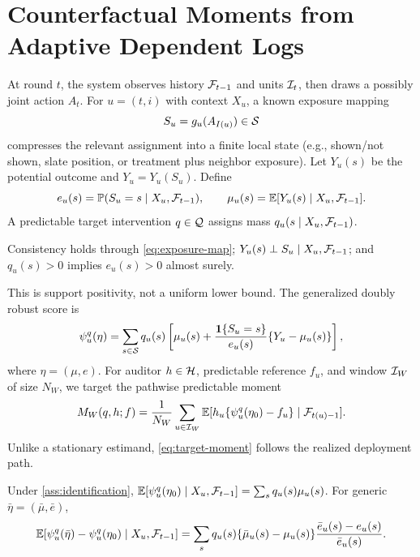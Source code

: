 \section{Counterfactual Moments from Adaptive Dependent Logs}
\label{sec:setup}

At round $t$, the system observes history $\mathcal{F}_{t-1}$ and units $\mathcal{I}_t$, then draws a possibly joint action $A_t$. For $u=(t,i)$ with context $X_u$, a known exposure mapping
\begin{equation}
S_u=g_u(A_{I(u)})\in\mathcal{S}
\label{eq:exposure-map}
\end{equation}
compresses the relevant assignment into a finite local state (e.g., shown/not shown, slate position, or treatment plus neighbor exposure). Let $Y_u(s)$ be the potential outcome and $Y_u=Y_u(S_u)$. Define
\begin{equation}
e_u(s)=\mathbb{P}(S_u=s\mid X_u,\mathcal{F}_{t-1}),\qquad
\mu_u(s)=\mathbb{E}[Y_u(s)\mid X_u,\mathcal{F}_{t-1}].
\label{eq:nuisance}
\end{equation}
A predictable target intervention $q\in\mathcal{Q}$ assigns mass $q_u(s\mid X_u,\mathcal{F}_{t-1})$.

\begin{assumption}
\label{ass:identification}
Consistency holds through \cref{eq:exposure-map}; $Y_u(s)\perp S_u\mid X_u,\mathcal{F}_{t-1}$; and $q_u(s)>0$ implies $e_u(s)>0$ almost surely.
\end{assumption}
This is support positivity, not a uniform lower bound. The generalized doubly robust score is
\begin{equation}
\psi_u^q(\eta)=\sum_{s\in\mathcal{S}}q_u(s)
\left[\mu_u(s)+\frac{\mathbf{1}\{S_u=s\}}{e_u(s)}\{Y_u-\mu_u(s)\}\right],
\label{eq:orthogonal-score}
\end{equation}
where $\eta=(\mu,e)$. For auditor $h\in\mathcal{H}$, predictable reference $f_u$, and window $\mathcal{I}_W$ of size $N_W$, we target the pathwise predictable moment
\begin{equation}
M_W(q,h;f)=\frac1{N_W}\sum_{u\in\mathcal{I}_W}
\mathbb{E}[h_u\{\psi_u^q(\eta_0)-f_u\}\mid\mathcal{F}_{t(u)-1}].
\label{eq:target-moment}
\end{equation}
Unlike a stationary estimand, \cref{eq:target-moment} follows the realized deployment path.

\begin{proposition}
\label{prop:dr}
Under \cref{ass:identification}, $\mathbb{E}[\psi_u^q(\eta_0)\mid X_u,\mathcal{F}_{t-1}]=\sum_s q_u(s)\mu_u(s)$. For generic $\bar\eta=(\bar\mu,\bar e)$,
\begin{equation}
\mathbb{E}[\psi_u^q(\bar\eta)-\psi_u^q(\eta_0)\mid X_u,\mathcal{F}_{t-1}]
=\sum_s q_u(s)\{\bar\mu_u(s)-\mu_u(s)\}
\frac{\bar e_u(s)-e_u(s)}{\bar e_u(s)}.
\label{eq:dr-remainder}
\end{equation}
\end{proposition}

